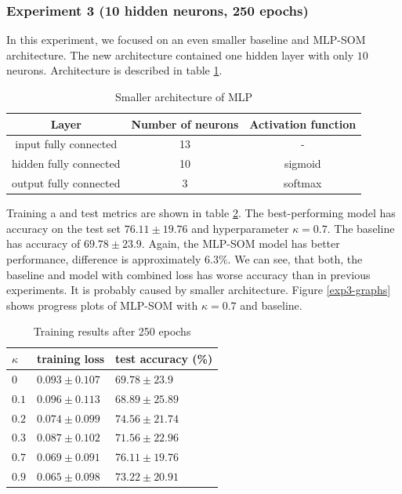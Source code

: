 \newpage
\subsubsection{Experiment 3 (10 hidden neurons, 250 epochs)}

In this experiment, we focused on an even smaller baseline and MLP-SOM architecture. The new architecture contained one hidden layer with only $10$ neurons. Architecture is described in table \ref{mlp=layers=small}. 

\begin{table}[ht]
    \centering
    \begin{tabular}{ |c|c|c|} 
     \hline
            Layer & Number of neurons & Activation function\\
            \hline
            input fully connected & 13 &  - \\
            \color{purple} hidden fully connected & \color{purple} 10 & sigmoid  \\
            output fully connected  & 3 & softmax \\
     \hline
    \end{tabular}
    \caption{Smaller architecture of MLP}
    \label{mlp=layers=small}
\end{table}

Training a and test metrics are shown in table \ref{exp3-res-table}. The best-performing model has accuracy on the test set $76.11	\pm 19.76$ and hyperparameter $\kappa = 0.7$. The baseline has accuracy of $69.78	\pm 23.9$. Again, the MLP-SOM model has better performance, difference is approximately $6.3\%$. We can see, that both, the baseline and model with combined loss has worse accuracy than in previous experiments. It is probably caused by smaller architecture. Figure \ref{exp3-graphs} shows progress plots of MLP-SOM with $\kappa = 0.7$ and baseline.



\begin{table}[h!]
\centering
\begin{tabular}{|l|l|l|}
\hline
$\kappa$  & training loss & test accuracy (\%) \\ \hline
\color{purple}$0$ & \color{purple}  $0.093	\pm 0.107 $  & \color{purple} $69.78	\pm 23.9$  \\ \hline
$0.1$ &   $0.096	\pm 0.113 $  &  $68.89	\pm 25.89$  \\ \hline
$0.2$ &   $0.074	\pm 0.099 $  &  $74.56	\pm 21.74$  \\ \hline
$0.3$ &   $0.087	\pm 0.102 $  &  $71.56	\pm 22.96$  \\ \hline
\color{purple}$0.7$ & \color{purple}  $0.069	\pm 0.091 $  & \color{purple} $76.11	\pm 19.76$  \\ \hline
$0.9$ &   $0.065	\pm 0.098 $  &  $73.22	\pm 20.91$   \\ \hline
\end{tabular}
\caption{Training results after 250 epochs}
\label{exp3-res-table}
\end{table}

